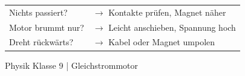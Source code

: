 \documentclass[11pt, a5paper]{article}
\begin{document}
\begin{tippbox}[TIPPS]
\begin{tabular}{@{}p{3.5cm}@{}l@{}}
Nichts passiert? & $\rightarrow$ Kontakte prüfen, Magnet näher \\[0.3em]
Motor brummt nur? & $\rightarrow$ Leicht anschieben, Spannung hoch \\[0.3em]
Dreht rückwärts? & $\rightarrow$ Kabel oder Magnet umpolen \\
\end{tabular}
\end{tippbox}

\vfill

\begin{center}
\scriptsize\textcolor{mittelgrau}{Physik Klasse 9 | Gleichstrommotor}
\end{center}
\end{document}
